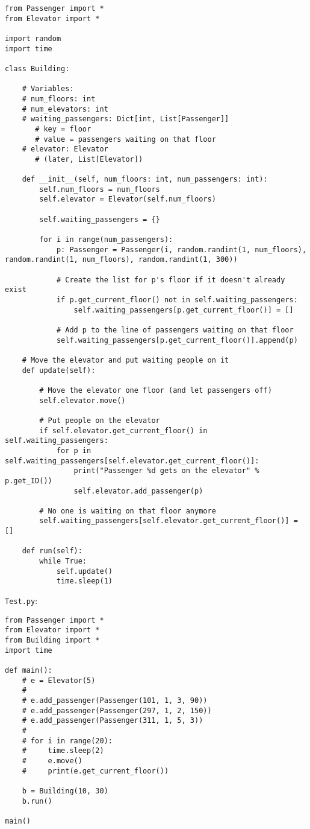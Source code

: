 \documentclass{article}
\begin{document}
\begin{verbatim}
from Passenger import *
from Elevator import *

import random
import time

class Building:

    # Variables:
    # num_floors: int
    # num_elevators: int
    # waiting_passengers: Dict[int, List[Passenger]]
       # key = floor
       # value = passengers waiting on that floor
    # elevator: Elevator
       # (later, List[Elevator])

    def __init__(self, num_floors: int, num_passengers: int):
        self.num_floors = num_floors
        self.elevator = Elevator(self.num_floors)

        self.waiting_passengers = {}

        for i in range(num_passengers):
            p: Passenger = Passenger(i, random.randint(1, num_floors), random.randint(1, num_floors), random.randint(1, 300))

            # Create the list for p's floor if it doesn't already exist
            if p.get_current_floor() not in self.waiting_passengers:
                self.waiting_passengers[p.get_current_floor()] = []

            # Add p to the line of passengers waiting on that floor
            self.waiting_passengers[p.get_current_floor()].append(p)

    # Move the elevator and put waiting people on it
    def update(self):

        # Move the elevator one floor (and let passengers off)
        self.elevator.move()

        # Put people on the elevator
        if self.elevator.get_current_floor() in self.waiting_passengers:
            for p in self.waiting_passengers[self.elevator.get_current_floor()]:
                print("Passenger %d gets on the elevator" % p.get_ID())
                self.elevator.add_passenger(p)

        # No one is waiting on that floor anymore
        self.waiting_passengers[self.elevator.get_current_floor()] = []

    def run(self):
        while True:
            self.update()
            time.sleep(1)
\end{verbatim}

\newpage
\noindent \texttt{Test.py}:

\begin{verbatim}
from Passenger import *
from Elevator import *
from Building import *
import time

def main():
    # e = Elevator(5)
    #
    # e.add_passenger(Passenger(101, 1, 3, 90))
    # e.add_passenger(Passenger(297, 1, 2, 150))
    # e.add_passenger(Passenger(311, 1, 5, 3))
    #
    # for i in range(20):
    #     time.sleep(2)
    #     e.move()
    #     print(e.get_current_floor())

    b = Building(10, 30)
    b.run()

main()
\end{verbatim}
\end{document}
